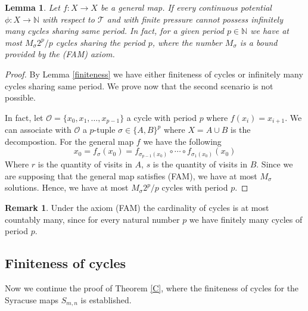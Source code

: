 \documentclass[12 pt]{amsart}
\newtheorem{lemma}[theorem]{Lemma}
\theoremstyle{definition}
\newtheorem{remark}[theorem]{Remark}
\begin{document}
    \begin{lemma}\label{boundcyclegeneral}
    	Let $f: X \to X$ be a general map. If every continuous potential $\phi : X \to \mathbb{N}$ with respect to $\mathcal{T}$ and with finite pressure cannot possess infinitely many cycles sharing same period. In fact, for a given period $p \in \mathbb{N}$ we have at most $M_{\sigma}2^{p}/p$ cycles sharing the period $p$, where the number $M_{\sigma}$ is a bound provided by the (FAM) axiom.
    \end{lemma}
    \begin{proof}
    	By Lemma \ref{finiteness} we have either finiteness of cycles or infinitely many cycles sharing same period. We prove now that the second scenario is not possible.
    	
    	In fact, let $\mathcal{O} = \{x_{0}, x_{1}, \dots, x_{p-1}\}$ a cycle with period $p$ where $f(x_{i}) = x_{i+1}$. We can associate with $\mathcal{O}$ a $p$-tuple $\sigma \in \{A, B\}^{p}$ where $X = A \cup B$ is the decompostion. For the general map $f$ we have the following
    	\[
    	x_{0} = f_{\sigma}(x_{0}) = f_{\sigma_{p-1}(x_{0})} \circ \cdots \circ f_{\sigma_{1}(x_{0})}(x_{0})
    	\] 
    	Where $r$ is the quantity of visits in $A$, $s$ is the quantity of visits in $B$. Since we are supposing that the general map satisfies (FAM), we have at most $M_{\sigma}$ solutions. Hence, we have at most $M_{\sigma}2^{p}/p$ cycles with period $p$.
    \end{proof}
    	
    	\begin{remark}
    		Under the axiom (FAM) the cardinality of cycles is at most countably many, since for every natural number $p$ we have finitely many cycles of period $p$.
    	\end{remark}
	
	
	\subsection{Finiteness of cycles}

Now we continue the proof of Theorem \ref{C}, where the finiteness of cycles for the Syracuse maps $S_{m,n}$ is established.
\end{document}
